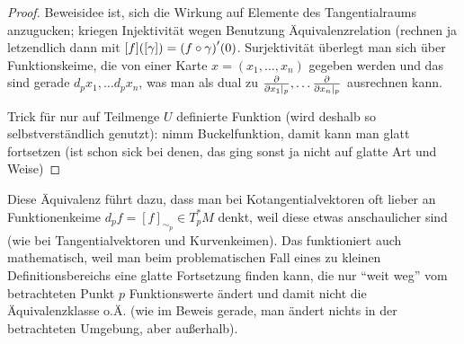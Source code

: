 \documentclass[../H_Analysis_main.tex]{subfiles}
\begin{document}
\begin{proof}
Beweisidee ist, sich die Wirkung auf Elemente des Tangentialraums anzugucken; kriegen Injektivität wegen Benutzung Äquivalenzrelation (rechnen ja letzendlich dann mit $[f]\qty([\gamma]) = \qty(f \circ \gamma)'(0)$. Surjektivität überlegt man sich über Funktionskeime, die von einer Karte $x = (x_1, \dots, x_n)$ gegeben werden und das sind gerade $d_p x_1, \dots d_p x_n$, was man als dual zu $\pdv{x_1 \mid_p}, \dots \pdv{x_n \mid_p}$ ausrechnen kann.


Trick für nur auf Teilmenge $U$ definierte Funktion (wird deshalb so selbstverständlich genutzt): nimm Buckelfunktion, damit kann man glatt fortsetzen (ist schon sick bei denen, das ging sonst ja nicht auf glatte Art und Weise)
\end{proof}


Diese Äquivalenz führt dazu, dass man bei Kotangentialvektoren oft lieber an Funktionenkeime $d_p f = [f]_{\sim_p} \in T^*_p M$ denkt, weil diese etwas anschaulicher sind (wie bei Tangentialvektoren und Kurvenkeimen). Das funktioniert auch mathematisch, weil man beim problematischen Fall eines zu kleinen Definitionsbereichs eine glatte Fortsetzung finden kann, die nur \enquote{weit weg} vom betrachteten Punkt $p$ Funktionswerte ändert und damit nicht die Äquivalenzklasse o.Ä. (wie im Beweis gerade, man ändert nichts in der betrachteten Umgebung, aber außerhalb).

\end{document}
